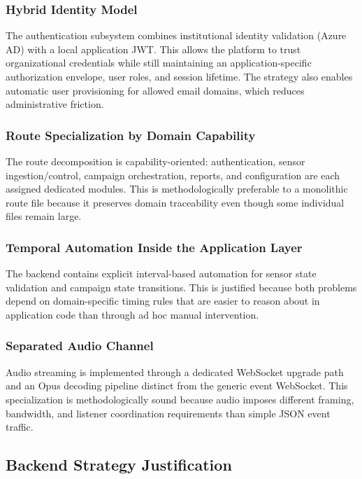 \documentclass[11pt,a4paper]{article}
\begin{document}
\subsubsection{Hybrid Identity Model}
The authentication subsystem combines institutional identity validation (Azure AD) with a local application JWT. This allows the platform to trust organizational credentials while still maintaining an application-specific authorization envelope, user roles, and session lifetime. The strategy also enables automatic user provisioning for allowed email domains, which reduces administrative friction.

\subsubsection{Route Specialization by Domain Capability}
The route decomposition is capability-oriented: authentication, sensor ingestion/control, campaign orchestration, reports, and configuration are each assigned dedicated modules. This is methodologically preferable to a monolithic route file because it preserves domain traceability even though some individual files remain large.

\subsubsection{Temporal Automation Inside the Application Layer}
The backend contains explicit interval-based automation for sensor state validation and campaign state transitions. This is justified because both problems depend on domain-specific timing rules that are easier to reason about in application code than through ad hoc manual intervention.

\subsubsection{Separated Audio Channel}
Audio streaming is implemented through a dedicated WebSocket upgrade path and an Opus decoding pipeline distinct from the generic event WebSocket. This specialization is methodologically sound because audio imposes different framing, bandwidth, and listener coordination requirements than simple JSON event traffic.

\subsection{Backend Strategy Justification}
\end{document}
